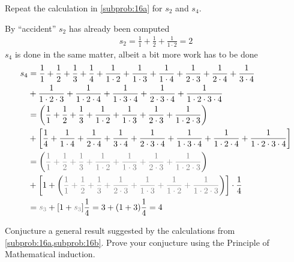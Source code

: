 \documentclass[a4paper, english, 12pt]{article} %
\begin{document}
\begin{subproblem}
    \label{subprob:16b}
  Repeat the calculation in \cref{subprob:16a} for $s_2$ and $s_4$.
\end{subproblem}

\begin{answer}
  By ``accident'' $s_2$ has already been computed
  \begin{align*}
    s_2 = \frac{1}{1} + \frac{1}{2} + \frac{1}{1 \cdot 2} = 2
  \end{align*}
  $s_4$ is done in the same matter, albeit a bit more work has to be done
  \begin{align*}
        s_4
    & = \frac{1}{1} + \frac{1}{2} + \frac{1}{3} + \frac{1}{4}
      + \frac{1}{1 \cdot 2} + \frac{1}{1 \cdot 3} + \frac{1}{1 \cdot 4} 
      + \frac{1}{2 \cdot 3} + \frac{1}{2 \cdot 4} + \frac{1}{3 \cdot 4} \\
    & + \frac{1}{1 \cdot 2 \cdot 3} + \frac{1}{1 \cdot 2 \cdot 4} + \frac{1}{1 \cdot 3 \cdot 4}
    + \frac{1}{2 \cdot 3 \cdot 4} + \frac{1}{1\cdot 2 \cdot 3 \cdot 4} \\
    & = \left(   \frac{1}{1} + \frac{1}{2} + \frac{1}{3}
      + \frac{1}{1\cdot 2} + \frac{1}{ 1 \cdot 3} + \frac{1}{2 \cdot 3} + \frac{1}{1 \cdot 2 \cdot 3} \right)\\
    & + \left[ \frac{1}{4}
      + \frac{1}{1\cdot 4} + \frac{1}{2 \cdot 4} + \frac{1}{3 \cdot 4} + \frac{1}{2 \cdot 3 \cdot 4} + \frac{1}{1 \cdot 3 \cdot 4} + \frac{1}{1 \cdot 2 \cdot 4} + \frac{1}{1 \cdot 2 \cdot 3 \cdot 4}\right] \\
    & = \left(   \textcolor{gray}{\frac{1}{1} + \frac{1}{2} + \frac{1}{3}
      + \frac{1}{1\cdot 2} + \frac{1}{ 1 \cdot 3} + \frac{1}{2 \cdot 3} + \frac{1}{1 \cdot 2 \cdot 3}} \right)\\
    & + \left[ 1 
      +  \left( \textcolor{gray}{\frac{1}{1} +  \frac{1}{2} + \frac{1}{3} + \frac{1}{2 \cdot 3} + \frac{1}{1 \cdot 3} + \frac{1}{1 \cdot 2} + \frac{1}{1 \cdot 2 \cdot 3}}\right)\right] \cdot \frac{1}{4} \\
    & = \textcolor{gray}{s_3} + [1 + \textcolor{gray}{s_3}]\frac{1}{4} = 3 + (1+3)\frac{1}{4} = 4 
  \end{align*}
\end{answer}

\begin{subproblem}
  Conjucture a general result suggested by the calculations from
  \cref{subprob:16a,subprob:16b}. Prove your conjucture using the Principle of
  Mathematical induction.
\end{subproblem}
\end{document}
